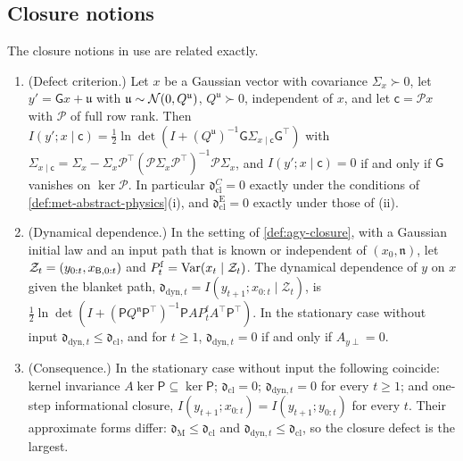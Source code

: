 \subsection{Closure notions}\label{sup:met-closure-notions}

The closure notions in use are related exactly.

\begin{proposition}\label{prop:met-closure-notions}
\begin{enumerate}
\item[(a)] (Defect criterion.) Let $x$ be a Gaussian vector with covariance $\Sigma_x\succ0$, let $y'=\mathsf Gx+\mathfrak u$ with $\mathfrak u\sim\mathcal{N}(0,Q^{\mathfrak u})$, $Q^{\mathfrak u}\succ0$, independent of $x$, and let $\mathsf c=\mathcal Px$ with $\mathcal P$ of full row rank. Then $I(y';x\mid\mathsf c)=\frac12\ln\det(I+(Q^{\mathfrak u})^{-1}\mathsf G\Sigma_{x\mid\mathsf c}\mathsf G^\top)$ with $\Sigma_{x\mid\mathsf c}=\Sigma_x-\Sigma_x\mathcal P^\top(\mathcal P\Sigma_x\mathcal P^\top)^{-1}\mathcal P\Sigma_x$, and $I(y';x\mid\mathsf c)=0$ if and only if $\mathsf G$ vanishes on $\ker\mathcal P$. In particular $\mathfrak d^C_{\mathrm{cl}}=0$ exactly under the conditions of \cref{def:met-abstract-physics}(i), and $\mathfrak d^{\mathrm E}_{\mathrm{cl}}=0$ exactly under those of (ii).
\item[(b)] (Dynamical dependence.) In the setting of \cref{def:agy-closure}, with a Gaussian initial law and an input path that is known or independent of $(x_0,\mathfrak n)$, let $\mathcal Z_t=(y_{0:t},x_{\mathsf{B},0:t})$ and $P^{\mathrm f}_t=\operatorname{Var}(x_t\mid\mathcal Z_t)$. The dynamical dependence of $y$ on $x$ given the blanket path, $\mathfrak d_{\mathrm{dyn},t}=I(y_{t+1};x_{0:t}\mid\mathcal Z_t)$, is $\frac12\ln\det(I+(\mathsf PQ^{\mathfrak n}\mathsf P^\top)^{-1}\mathsf PAP^{\mathrm f}_tA^\top\mathsf P^\top)$. In the stationary case without input $\mathfrak d_{\mathrm{dyn},t}\le\mathfrak d_{\mathrm{cl}}$, and for $t\ge1$, $\mathfrak d_{\mathrm{dyn},t}=0$ if and only if $A_{y\perp}=0$.
\item[(c)] (Consequence.) In the stationary case without input the following coincide: kernel invariance $A\ker\mathsf P\subseteq\ker\mathsf P$; $\mathfrak d_{\mathrm{cl}}=0$; $\mathfrak d_{\mathrm{dyn},t}=0$ for every $t\ge1$; and one-step informational closure, $I(y_{t+1};x_{0:t})=I(y_{t+1};y_{0:t})$ for every $t$. Their approximate forms differ: $\mathfrak d_{\mathrm M}\le\mathfrak d_{\mathrm{cl}}$ and $\mathfrak d_{\mathrm{dyn},t}\le\mathfrak d_{\mathrm{cl}}$, so the closure defect is the largest.
\end{enumerate}
\end{proposition}
